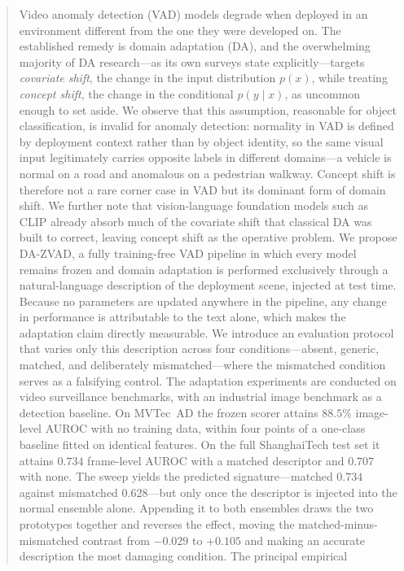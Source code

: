 \documentclass[a4paper,fleqn]{cas-sc}
\begin{document}
\begin{abstract}
Video anomaly detection (VAD) models degrade when deployed in an environment
different from the one they were developed on. The established remedy is domain
adaptation (DA), and the overwhelming majority of DA research---as its own
surveys state explicitly---targets \emph{covariate shift}, the change in the
input distribution $p(x)$, while treating \emph{concept shift}, the change in
the conditional $p(y \mid x)$, as uncommon enough to set aside. We observe that
this assumption, reasonable for object classification, is invalid for anomaly
detection: normality in VAD is defined by deployment context rather than by
object identity, so the same visual input legitimately carries opposite labels
in different domains---a vehicle is normal on a road and anomalous on a
pedestrian walkway. Concept shift is therefore not a rare corner case in VAD but
its dominant form of domain shift. We further note that vision-language
foundation models such as CLIP already absorb much of the covariate shift that
classical DA was built to correct, leaving concept shift as the operative
problem. We propose DA-ZVAD, a fully training-free VAD pipeline in which every
model remains frozen and domain adaptation is performed exclusively through a
natural-language description of the deployment scene, injected at test time.
Because no parameters are updated anywhere in the pipeline, any change in
performance is attributable to the text alone, which makes the adaptation claim
directly measurable. We introduce an evaluation protocol that varies only this
description across four conditions---absent, generic, matched, and deliberately
mismatched---where the mismatched condition serves as a falsifying control. The
adaptation experiments are conducted on video surveillance benchmarks, with an
industrial image benchmark as a detection baseline. On MVTec~AD the frozen
scorer attains $88.5\%$ image-level AUROC with no training data, within four
points of a one-class baseline fitted on identical features. On the full
ShanghaiTech test set it attains $0.734$ frame-level AUROC with a matched
descriptor and $0.707$ with none. The sweep yields the predicted
signature---matched $0.734$ against mismatched $0.628$---but only once the
descriptor is injected into the normal ensemble alone. Appending it to both
ensembles draws the two prototypes together and reverses the effect, moving the
matched-minus-mismatched contrast from $-0.029$ to $+0.105$ and making an
accurate description the most damaging condition. The principal empirical

\end{abstract}
\end{document}
